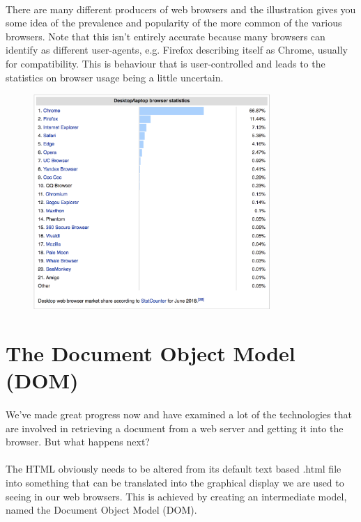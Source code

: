 \paragraph{} There are many different producers of web browsers and the illustration gives you some idea of the prevalence and popularity of the more common of the various browsers. Note that this isn't entirely accurate because many browsers can identify as different user-agents, e.g. Firefox describing itself as Chrome, usually for compatibility. This is behaviour that is user-controlled and leads to the statistics on browser usage being a little uncertain.


\begin{figure}[H]
\centering
\includegraphics[width=0.8\textwidth]{figures/browser-stats.png}
\label{fig:browser-stats}
\end{figure}


\section{The Document Object Model (DOM)}
\paragraph{} We've made great progress now and have examined a lot of the technologies that are involved in retrieving a document from a web server and getting it into the browser. But what happens next?
\paragraph{} The HTML obviously needs to be altered from its default text based .html file into something that can be translated into the graphical display we are used to seeing in our web browsers. This is achieved by creating an intermediate model, named the Document Object Model (DOM).
